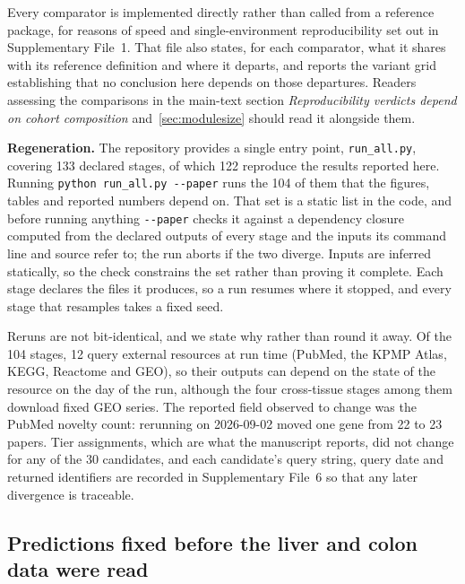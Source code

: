 \documentclass[11pt]{article}
\begin{document}
Every comparator is implemented directly rather than called from a reference package, for
reasons of speed and single-environment reproducibility set out in Supplementary File~1. That file
also states, for each comparator, what it shares with its reference definition and where it
departs, and reports the variant grid establishing that no conclusion here depends on those
departures. Readers assessing the comparisons in the main-text section \textit{Reproducibility verdicts depend on cohort composition}
and~\ref{sec:modulesize} should read it alongside them.



\textbf{Regeneration.} The repository provides a single entry point, \texttt{run\_all.py},
covering 133 declared stages, of which 122 reproduce the results reported here. Running
\texttt{python run\_all.py -{}-paper} runs the 104 of them that the figures, tables and
reported numbers depend on. That set is a static list in the code, and before running anything
\texttt{-{}-paper} checks it against a dependency closure computed from the declared outputs of
every stage and the inputs its command line and source refer to; the run aborts if the two
diverge. Inputs are inferred statically, so the check constrains the set rather than proving it
complete.
Each stage declares the files it produces, so a run resumes where it stopped, and every stage
that resamples takes a fixed seed.

Reruns are not bit-identical, and we state why rather than round it away. Of the 104 stages,
12 query external resources at run time (PubMed, the KPMP Atlas, KEGG, Reactome and GEO),
so their outputs can depend on the state of the resource on the day of the run, although the
four cross-tissue stages among them download fixed GEO series. The reported
field observed to change was the PubMed novelty count: rerunning on 2026-09-02 moved one
gene from 22 to 23 papers. Tier assignments, which are what the manuscript reports, did not
change for any of the 30 candidates, and each candidate's query string, query date and returned
identifiers are recorded in Supplementary File~6 so that any later divergence is traceable.


\label{note:S10}
\subsection{Predictions fixed before the liver and colon data were read}\label{sec:xtmethods}
\end{document}

